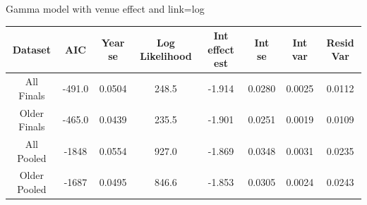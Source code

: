 \documentclass[12pt, letterpaper, titlepage]{article}
\begin{document}
Gamma model with venue effect and link=log
\begin{center}
  \begin{tabular}{|c | c | c | c | c | c | c | c |} 
   \hline
   Dataset & AIC & Year se & Log Likelihood & Int effect est & Int se & Int var & Resid Var \\ [0.5ex] 
   \hline\hline
   All Finals & -491.0 & 0.0504 & 248.5 & -1.914 & 0.0280 & 0.0025 & 0.0112 \\
   \hline
   Older Finals & -465.0 & 0.0439 & 235.5 & -1.901 & 0.0251 & 0.0019 & 0.0109 \\ 
   \hline
   All Pooled & -1848 & 0.0554 & 927.0 & -1.869 & 0.0348 & 0.0031 & 0.0235 \\
   \hline
   Older Pooled & -1687 & 0.0495 & 846.6 & -1.853 & 0.0305 & 0.0024 & 0.0243 \\
   \hline
  \end{tabular}
  \end{center}



\end{document}
